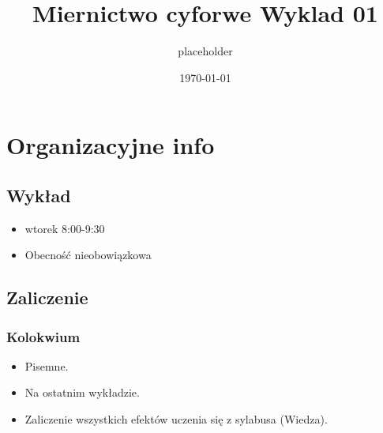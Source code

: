\documentclass[11pt]{article}
\author{placeholder}
\date{\today}
\title{Miernictwo cyforwe Wyklad 01}
\begin{document}
\maketitle
\tableofcontents


\section{Organizacyjne info}
\label{sec:orge6f6599}
\subsection{Wykład}
\label{sec:orga31479d}
\begin{itemize}
\item wtorek 8:00-9:30
\item Obecność nieobowiązkowa
\end{itemize}
\subsection{Zaliczenie}
\label{sec:org77e7096}
\subsubsection{Kolokwium}
\label{sec:orgeba3b32}
\begin{itemize}
\item Pisemne.
\item Na ostatnim wykładzie.
\item Zaliczenie wszystkich efektów uczenia się z sylabusa (Wiedza).
\end{itemize}
\end{document}
